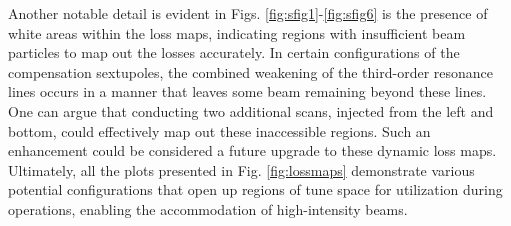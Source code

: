 Another notable detail is evident in Figs. \ref{fig:sfig1}-\ref{fig:sfig6} is the presence of white areas within the loss maps, indicating regions with insufficient beam particles to map out the losses accurately. In certain configurations of the compensation sextupoles, the combined weakening of the third-order resonance lines occurs in a manner that leaves some beam remaining beyond these lines. One can argue that conducting two additional scans, injected from the left and bottom, could effectively map out these inaccessible regions. Such an enhancement could be considered a future upgrade to these dynamic loss maps. Ultimately, all the plots presented in Fig. \ref{fig:lossmaps} demonstrate various potential configurations that open up regions of tune space for utilization during operations, enabling the accommodation of high-intensity beams.

